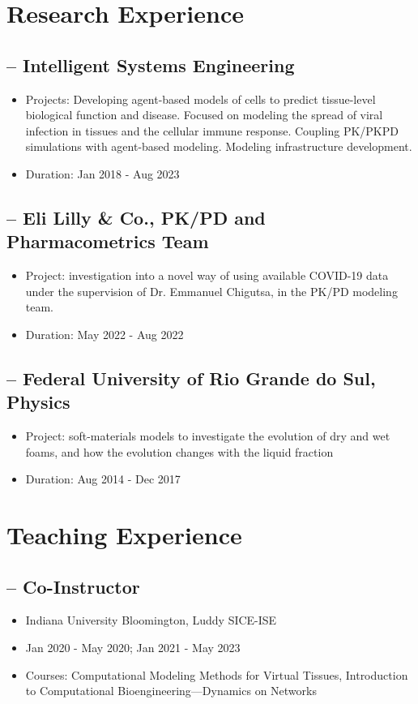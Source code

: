 \section*{  Research Experience}
\subsection*{-- Intelligent Systems Engineering}
\begin{itemize}\setlength\itemsep{-.9em}
    \item Projects: Developing agent-based models of cells to predict tissue-level biological function and disease. Focused on modeling the spread of viral infection in tissues and the cellular immune response. Coupling PK/PKPD simulations with agent-based modeling. Modeling infrastructure development.
    \item Duration: Jan 2018 - Aug 2023
\end{itemize}

\subsection*{-- Eli Lilly \& Co., PK/PD and Pharmacometrics Team}
\begin{itemize}\setlength\itemsep{-.9em}
    \item Project: investigation into a novel way of using available COVID-19 data under the supervision of Dr. Emmanuel Chigutsa, in the PK/PD modeling team.
    \item Duration: May 2022 - Aug 2022
\end{itemize}

\subsection*{-- Federal University of Rio Grande do Sul, Physics}
\begin{itemize}\setlength\itemsep{-.9em}
    \item Project: soft-materials models to investigate the evolution of dry and wet foams, and how the evolution changes with the liquid fraction
    \item Duration: Aug 2014 - Dec 2017
\end{itemize}

\section*{  Teaching Experience}
\subsection*{-- Co-Instructor}
\begin{itemize}\setlength\itemsep{-.9em}
    \item Indiana University Bloomington, Luddy SICE-ISE
    \item Jan 2020 - May 2020; Jan 2021 - May 2023
    \item Courses: Computational Modeling Methods for Virtual Tissues, Introduction to Computational Bioengineering—Dynamics on Networks
\end{itemize}

